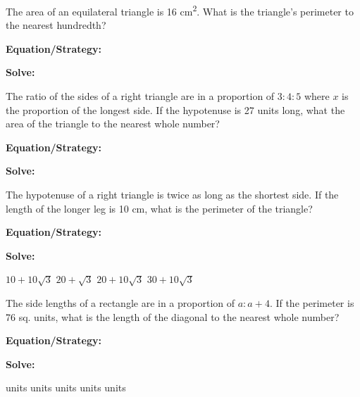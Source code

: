 \vfill
\newpage
\begin{multicols*}{2}
\begin{outline}[enumerate]
\medium

\1 The area of an equilateral triangle is 16 cm\textsuperscript{2}. What is the triangle's perimeter to the nearest hundredth?

\bigskip
\textbf{Equation/Strategy:} \hrulefill

\bigskip
\textbf{Solve:} 

\vfill
{}

\midline

\1 The ratio of the sides of a right triangle are in a proportion of $3:4:5$ where $x$ is the proportion of the longest side. If the hypotenuse is 27 units long, what the area of the triangle to the nearest whole number?

\bigskip
\textbf{Equation/Strategy:} \hrulefill

\bigskip
\textbf{Solve:}

\vfill
{}

\columnbreak
\advanced

\1 The hypotenuse of a right triangle is twice as long as the shortest side. If the length of the longer leg is 10 cm, what is the perimeter of the triangle?

\bigskip
\textbf{Equation/Strategy:} \hrulefill

\bigskip
\textbf{Solve:}

\vfill
\2 $10+10\sqrt{3}$
\2 $20+\sqrt{3}$
\2 $20+10\sqrt{3}$
\2 $30+10\sqrt{3}$

\midline

\1 The side lengths of a rectangle are in a proportion of $a:a+4$. If the perimeter is 76 sq. units, what is the length of the diagonal to the nearest whole number?

\bigskip
\textbf{Equation/Strategy:}

\bigskip
\textbf{Solve:}

\vfill
{} units
 units
 units
 units
 units
\end{outline}
\end{multicols*}
